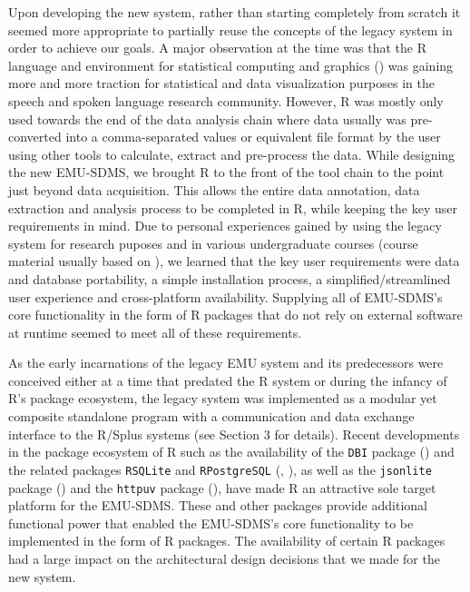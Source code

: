 \documentclass[]{book}
\theoremstyle{definition}
\theoremstyle{definition}
\theoremstyle{definition}
\theoremstyle{remark}
\begin{document}
Upon developing the new system, rather than starting completely from
scratch it seemed more appropriate to partially reuse the concepts of
the legacy system in order to achieve our goals. A major observation at
the time was that the R language and environment for statistical
computing and graphics (\citet{r-core-team:2016a}) was gaining more and
more traction for statistical and data visualization purposes in the
speech and spoken language research community. However, R was mostly
only used towards the end of the data analysis chain where data usually
was pre-converted into a comma-separated values or equivalent file
format by the user using other tools to calculate, extract and
pre-process the data. While designing the new EMU-SDMS, we brought R to
the front of the tool chain to the point just beyond data acquisition.
This allows the entire data annotation, data extraction and analysis
process to be completed in R, while keeping the key user requirements in
mind. Due to personal experiences gained by using the legacy system for
research puposes and in various undergraduate courses (course material
usually based on \citet{harrington:2010a}), we learned that the key user
requirements were data and database portability, a simple installation
process, a simplified/streamlined user experience and cross-platform
availability. Supplying all of EMU-SDMS's core functionality in the form
of R packages that do not rely on external software at runtime seemed to
meet all of these requirements.

As the early incarnations of the legacy EMU system and its predecessors
were conceived either at a time that predated the R system or during the
infancy of R's package ecosystem, the legacy system was implemented as a
modular yet composite standalone program with a communication and data
exchange interface to the R/Splus systems (see \citet{cassidy:sc2001a}
Section 3 for details). Recent developments in the package ecosystem of
R such as the availability of the \texttt{DBI} package
(\citet{r-special-interest-group-on-databases-r-sig-db:2016a}) and the
related packages \texttt{RSQLite} and \texttt{RPostgreSQL}
(\citet{wickham:2014a}, \citet{conway:2016a}), as well as the
\texttt{jsonlite} package (\citet{ooms:as2014a}) and the \texttt{httpuv}
package (\citet{rstudio:2015a}), have made R an attractive sole target
platform for the EMU-SDMS. These and other packages provide additional
functional power that enabled the EMU-SDMS's core functionality to be
implemented in the form of R packages. The availability of certain R
packages had a large impact on the architectural design decisions that
we made for the new system.
\end{document}
